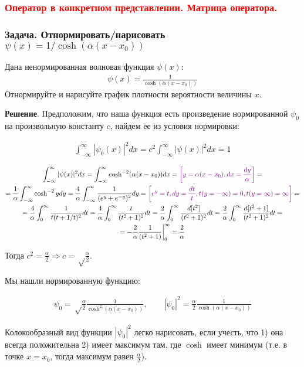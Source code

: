 \subsubsection{\textcolor{red}{Оператор в конкретном представлении. Матрица оператора.}}

\subsubsection{Задача. Отнормировать/нарисовать $\psi(x)=1/\cosh(\alpha(x-x_0))$}

Дана ненормированная волновая функция $\psi(x)$:
\begin{gather*}
\psi(x)=\frac{1}{\cosh(\alpha(x-x_0))}
\end{gather*}
Отнормируйте и нарисуйте график плотности вероятности величины $x$.

\textbf{Решение}. Предположим, что наша функция есть произведение нормированной $\psi_0$ на произвольную константу $c$, найдем ее из условия нормировки:

\begin{gather*}
\int_{-\infty}^{\infty}|\psi_0(x)|^2 dx=
c^2\int_{-\infty}^{\infty}|\psi(x)|^2 dx=1
\end{gather*}

\begin{gather*}
\int_{-\infty}^{\infty}|\psi(x)|^2 dx=
\int_{-\infty}^{\infty} \cosh^{-2}(\alpha(x-x_0)) dx=
\textcolor{violet}{\left[ y=\alpha(x-x_0), dx=\frac{dy}{\alpha}\right]}=\\=
\frac{1}{\alpha}\int_{-\infty}^{\infty} \cosh^{-2}y dy=
\frac{4}{\alpha}\int_{-\infty}^{\infty} \frac{1}{(e^y+e^{-y})^2}dy=
\textcolor{violet}{\left[ e^y=t, dy=\frac{dt}{t}, t(y=-\infty)=0, t(y=\infty)=\infty\right]}=\\=
%
\frac{4}{\alpha}\int_0^{\infty} \frac{1}{t(t+1/t)^2}dt=
\frac{4}{\alpha}\int_0^{\infty} \frac{t}{(t^2+1)^2}dt=
\frac{2}{\alpha}\int_0^{\infty} \frac{d[t^2]}{(t^2+1)^2}dt=
\frac{2}{\alpha}\int_0^{\infty} \frac{d[t^2+1]}{(t^2+1)^2}dt=\\=
-\frac{2}{\alpha}\frac{1}{(t^2+1)}\bigg|_{0}^{\infty}=
\frac{2}{\alpha}
\end{gather*}

Тогда  $c^2=\frac{\alpha}{2} \Rightarrow c=\sqrt\frac{\alpha}{2} $.

Мы нашли нормированную функцию:

\begin{gather*}
\psi_0=\sqrt\frac{\alpha}{2}\frac{1}{\cosh^2(\alpha(x-x_0))},\qquad
|\psi_0|^2=\frac{\alpha}{2}\frac{1}{\cosh(\alpha(x-x_0))}
\end{gather*}

Колокообразный вид функции $|\psi_0|^2$ легко нарисовать,  если учесть, что 1) она всегда положительна 2) имеет максимум там, где $\cosh$ имеет минимум (т.е. в точке $x=x_0$, тогда максимум равен $\frac{\alpha}{2}$).